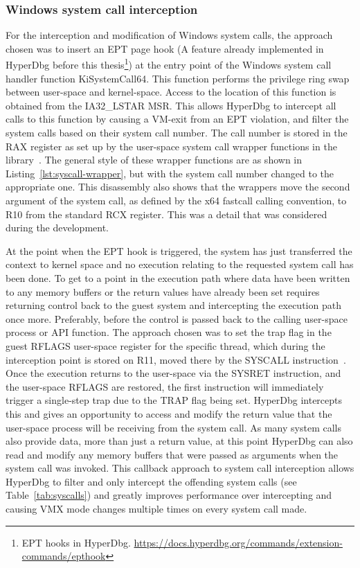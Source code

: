 \subsubsection{Windows system call interception}\label{syscall_interception}
For the interception and modification of Windows system calls, the approach chosen was to insert an EPT page hook (A feature already implemented in HyperDbg before this thesis\footnote{EPT hooks in HyperDbg. \url{https://docs.hyperdbg.org/commands/extension-commands/epthook}}) 
at the entry point of the Windows system call handler function KiSystemCall64. This function performs the privilege ring swap between user-space and kernel-space. 
Access to the location of this function is obtained from the IA32\_LSTAR MSR. 
This allows HyperDbg to intercept all calls to this function by causing a VM-exit from an EPT violation, and filter the system calls based on their system call number. 
The call number is stored in the RAX register as set up by the user-space system call wrapper functions in the  library~\cite{ntdll-lib}. The general style of these 
wrapper functions are as shown in Listing~\ref{lst:syscall-wrapper}, but with the system call number changed to the appropriate one.
This disassembly also shows that the wrappers move the second argument of the system call, as defined by the x64 fastcall calling convention, 
to R10 from the standard RCX register. This was a detail that was considered during the development.

At the point when the EPT hook is triggered, the system has just transferred the context to kernel space and no execution relating to the requested system call has been done. 
To get to a point in the execution path where data have been written to any memory buffers or the return values have already been set 
requires returning control back to the guest system and intercepting the execution path once more. Preferably, before the control is passed back to the calling user-space process or API function. 
The approach chosen was to set the trap flag in the guest RFLAGS user-space register for the specific thread, which during the interception point is stored on R11, moved there by the SYSCALL instruction~\cite[Volume 2B]{Intel-SDM2025}. 
Once the execution returns to the user-space via the SYSRET instruction, and the user-space RFLAGS are restored, the first instruction will immediately trigger a single-step trap due to the TRAP flag
being set. HyperDbg intercepts this and gives an opportunity to access and modify the return value that the user-space process will be receiving from the system call. 
As many system calls also provide data, more than just a return value, at this point HyperDbg can also read and modify any memory buffers that were 
passed as arguments when the system call was invoked. This callback approach to system call interception allows HyperDbg to filter and only intercept 
the offending system calls (see Table~\ref{tab:syscalls}) and greatly improves performance over intercepting and causing VMX mode changes multiple times on every system call made.


